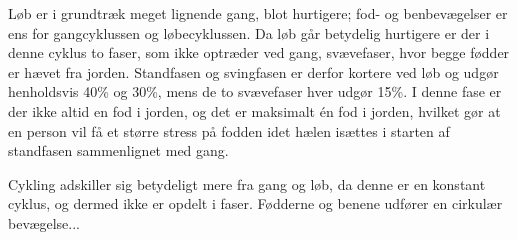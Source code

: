 Løb er i grundtræk meget lignende gang, blot hurtigere; fod- og benbevægelser er ens for gangcyklussen og løbecyklussen. Da løb går betydelig hurtigere er der i denne cyklus to faser, som ikke optræder ved gang, svævefaser, hvor begge fødder er hævet fra jorden. Standfasen og svingfasen er derfor kortere ved løb og udgør henholdsvis 40\% og 30\%, mens de to svævefaser hver udgør 15\%. \newline
I denne fase er der ikke altid en fod i jorden, og det er maksimalt én fod i jorden, hvilket gør at en person vil få et større stress på fodden idet hælen isættes i starten af standfasen sammenlignet med gang.

Cykling adskiller sig betydeligt mere fra gang og løb, da denne er en konstant cyklus, og dermed ikke er opdelt i faser. Fødderne og benene udfører en cirkulær bevægelse...




